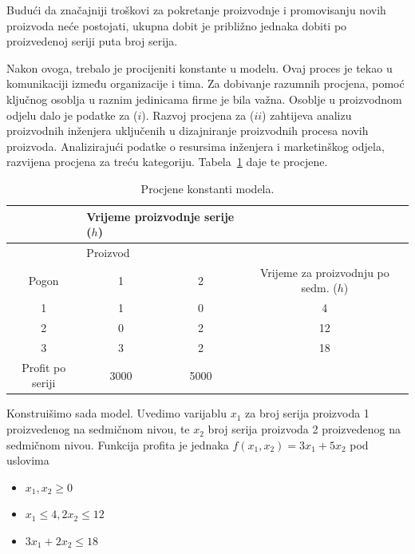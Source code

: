 \documentclass[a4paper, utf8, 11pt, colorlinks]{article}
\begin{document}
Budući da značajniji troškovi za pokretanje
 proizvodnje i promovisanju novih proizvoda neće postojati, ukupna dobit je približno jednaka dobiti po proizvedenoj seriji puta broj serija.  

Nakon ovoga, trebalo je procijeniti konstante u modelu. Ovaj proces je tekao u komunikaciji između organizacije i tima. 
Za dobivanje razumnih procjena, pomoć ključnog osoblja u raznim jedinicama firme je bila važna. Osoblje u proizvodnom odjelu dalo je podatke za ($i$). Razvoj procjena za ($ii$) zahtijeva analizu proizvodnih inženjera uključenih u dizajniranje proizvodnih procesa novih proizvoda. Analizirajući podatke o resursima inženjera i marketinškog odjela,  razvijena procjena za treću kategoriju. Tabela~\ref{tab:procjene-1} daje te procjene. 

\begin{table}[!ht]
    \centering
    \begin{tabular}{c|c c | c}
    \      &      \multicolumn{2}{l}{Vrijeme proizvodnje serije ($h$)}    & \  \\ \hline
    \      &      \multicolumn{2}{l}{Proizvod}                      & \  \\ 
    Pogon  &  1    &      2                                 & Vrijeme za proizvodnju po sedm. ($h$) \\ \hline 
           1 & 1  &  0 &  4  \\
           2 & 0  &  2 &  12  \\ 
           3 & 3  &  2 &  18  \\ \hline
           Profit po seriji & 3000 & 5000 & \  \\
           \hline
    \end{tabular}
    \caption{Procjene konstanti modela.}
    \label{tab:procjene-1}
\end{table}

Konstruišimo sada model. Uvedimo varijablu $x_1$ za broj serija proizvoda 1 proizvedenog na sedmičnom nivou, te $x_2$ broj serija proizvoda 2 proizvedenog na sedmičnom nivou. Funkcija profita je jednaka $f(x_1, x_2) = 3 x_1 + 5 x_2$ pod uslovima
\begin{itemize}
    \item $x_1, x_2 \geq 0$
    \item  $x_1 \leq 4, 2 x_2 \leq 12$
    \item $3 x_1 + 2 x_2 \leq 18$
\end{itemize}
\end{document}
